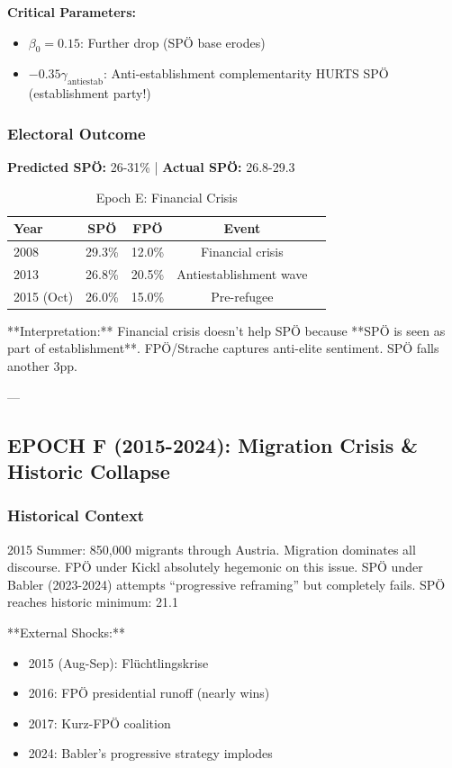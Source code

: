 {{{{{{\textbf{Critical Parameters:}
\begin{itemize}[nosep]
\item $\beta_0 = 0.15$: Further drop (SPÖ base erodes)
\item $-0.35 \gamma_{\text{antiestab}}$: Anti-establishment complementarity HURTS SPÖ (establishment party!)
\end{itemize}

\subsubsection{Electoral Outcome}

\textbf{Predicted SPÖ:} 26-31\% | \textbf{Actual SPÖ:} 26.8-29.3%

\begin{table}[h]
\centering
\caption{Epoch E: Financial Crisis}
\label{tab:epoche-spo}
\begin{tabular}{lcccc}
\toprule
Year & SPÖ & FPÖ & Event \\
\midrule
2008 & 29.3\% & 12.0\% & Financial crisis \\
2013 & 26.8\% & 20.5\% & Antiestablishment wave \\
2015 (Oct) & 26.0\% & 15.0\% & Pre-refugee \\
\bottomrule
\end{tabular}
\end{table}

**Interpretation:** Financial crisis doesn't help SPÖ because **SPÖ is seen as part of establishment**. FPÖ/Strache captures anti-elite sentiment. SPÖ falls another 3pp.

---

\subsection{EPOCH F (2015-2024): Migration Crisis & Historic Collapse}

\subsubsection{Historical Context}

2015 Summer: 850,000 migrants through Austria. Migration dominates all discourse. FPÖ under Kickl absolutely hegemonic on this issue. SPÖ under Babler (2023-2024) attempts ``progressive reframing'' but completely fails. SPÖ reaches historic minimum: 21.1%

**External Shocks:**
\begin{itemize}
\item 2015 (Aug-Sep): Flüchtlingskrise
\item 2016: FPÖ presidential runoff (nearly wins)
\item 2017: Kurz-FPÖ coalition
\item 2024: Babler's progressive strategy implodes
\end{itemize}

}}}}}}
